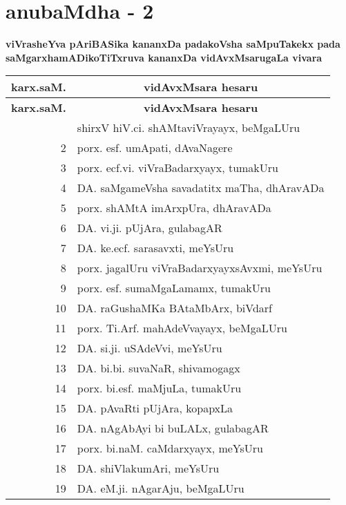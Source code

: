 \chapter*{anubaMdha - 2}

\lhead[]{}
\rhead[]{}

\begin{center}
{\large\bf viVrasheYva pAriBASika kananxDa padakoVsha saMpuTakekx pada saMgarxha\break mADikoTiTxruva kananxDa vidAvxMsarugaLa vivara}
\end{center}

{\renewcommand{\arraystretch}{1.3}
\begin{longtable}{|r|p{10cm}|}
\hline
{\bf karx.saM.} & \multicolumn{1}{c|}{\bf vidAvxMsara hesaru}\\
\hline
\endfirsthead
\hline
{\bf karx.saM.} & \multicolumn{1}{c|}{\bf vidAvxMsara hesaru}\\
\hline
\endhead
\hline
\endfoot
\endlastfoot
1 & shirxV hiV.ci. shAMtaviVrayayx, beMgaLUru\\
\hline
2 & porx. esf. umApati, dAvaNagere\\
\hline
3 & porx. ecf.vi. viVraBadarxyayx, tumakUru\\
\hline
4 & DA. saMgameVsha savadatitx maTha, dhAravADa\\
\hline
5 & porx. shAMtA imArxpUra, dhAravADa\\
\hline
6 & DA. vi.ji. pUjAra, gulabagAR\\
\hline
7 & DA. ke.ecf. sarasavxti, meYsUru\\
\hline
8 & porx. jagalUru viVraBadarxyayxsAvxmi, meYsUru\\
\hline
9 & porx. esf. sumaMgaLamamx, tumakUru\\
\hline
10 & DA. raGushaMKa BAtaMbArx, biVdarf\\
\hline
11 & porx. Ti.Arf. mahAdeVvayayx, beMgaLUru\\
\hline
12 & DA. si.ji. uSAdeVvi, meYsUru\\
\hline
13 & DA. bi.bi. suvaNaR, shivamogagx\\
\hline
14 & porx. bi.esf. maMjuLa, tumakUru\\
\hline
15 & DA. pAvaRti pUjAra, kopapxLa\\
\hline
16 & DA. nAgAbAyi bi buLALx, gulabagAR\\
\hline
17 & porx. bi.naM. caMdarxyayx, meYsUru\\
\hline
18 & DA. shiVlakumAri, meYsUru\\
\hline
19 & DA. eM.ji. nAgarAju, beMgaLUru\\

\end{longtable}}
